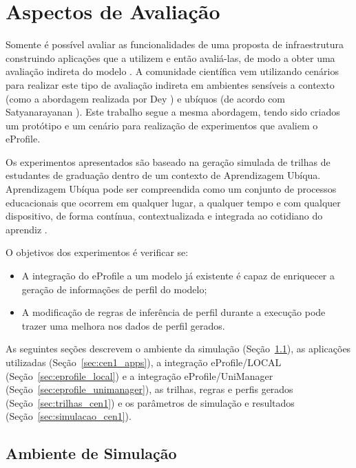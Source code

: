 \section{Aspectos de Avaliação}
\label{ch:avaliacao}

Somente é possível avaliar as funcionalidades de uma proposta de infraestrutura construindo aplicações que a utilizem e então avaliá-las, de modo a obter uma avaliação indireta do modelo \cite{edwards03}. A comunidade científica vem utilizando cenários para realizar este tipo de avaliação indireta em ambientes sensíveis a contexto (como a abordagem realizada por Dey \cite{dey2001b}) e ubíquos (de acordo com Satyanarayanan \cite{satyanarayanan01}). Este trabalho segue a mesma abordagem, tendo sido criados um protótipo e um cenário para realização de experimentos que avaliem o eProfile.

Os experimentos apresentados são baseado na geração simulada de trilhas de estudantes de graduação dentro de um contexto de Aprendizagem Ubíqua. Aprendizagem Ubíqua pode ser compreendida como um conjunto de processos educacionais que ocorrem em qualquer lugar, a qualquer tempo e com qualquer dispositivo, de forma contínua, contextualizada e integrada ao cotidiano do aprendiz \cite{barbosa11}.

O objetivos dos experimentos é verificar se:

\begin{itemize}
  \item A integração do eProfile a um modelo já existente é capaz de enriquecer a geração de informações de perfil do modelo;
  \item A modificação de regras de inferência de perfil durante a execução pode trazer uma melhora nos dados de perfil gerados.
\end{itemize}

As seguintes seções descrevem o ambiente da simulação (Seção~\ref{sec:desc_cen1}), as aplicações utilizadas (Seção~\ref{sec:cen1_apps}), a integração eProfile/LOCAL (Seção~\ref{sec:eprofile_local}) e a integração eProfile/UniManager (Seção~\ref{sec:eprofile_unimanager}), as trilhas, regras e perfis gerados (Seção~\ref{sec:trilhas_cen1}) e os parâmetros de simulação e resultados (Seção~\ref{sec:simulacao_cen1}).


\subsection{Ambiente de Simulação}
\label{sec:desc_cen1}

